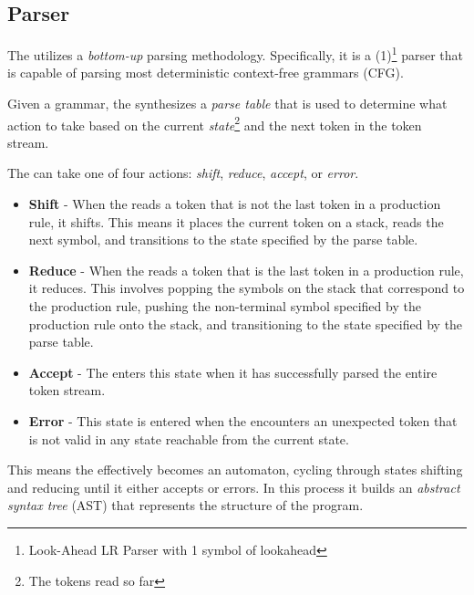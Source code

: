 \subsection{Parser}

The \lang{} \parser{} utilizes a \textit{bottom-up} parsing methodology.
Specifically, it is a \parserType{}(1)\footnote{Look-Ahead LR Parser with 1 symbol of
lookahead} parser that is capable of parsing most deterministic context-free
grammars (CFG).

Given a grammar, the \parser{} synthesizes a \textit{parse table} that is used to
determine what action to take based on the current \textit{state}\footnote{The tokens
read so far} and the next token in the token stream. 

The \parser{} can take one of four actions: \textit{shift}, \textit{reduce},
\textit{accept}, or \textit{error}. 

\begin{itemize} 
  
  \item \textbf{Shift} - When the \parser{} reads a token that is not the last token
    in a production rule, it shifts. This means it places the current token on a
    stack, reads the next symbol, and transitions to the state specified by the parse
    table.

  \item \textbf{Reduce} - When the \parser{} reads a token that is the last token in
    a production rule, it reduces. This involves popping the symbols on the stack
    that correspond to the production rule, pushing the non-terminal symbol specified
    by the production rule onto the stack, and transitioning to the state specified
    by the parse table.

  \item \textbf{Accept} - The \parser{} enters this state when it has successfully
    parsed the entire token stream.

  \item \textbf{Error} - This state is entered when the \parser{} encounters an
    unexpected token that is not valid in any state reachable from the current state.

\end{itemize}

This means the \parser{} effectively becomes an automaton, cycling through states
shifting and reducing until it either accepts or errors. In this process it builds an
\textit{abstract syntax tree} (AST) that represents the structure of the program.


